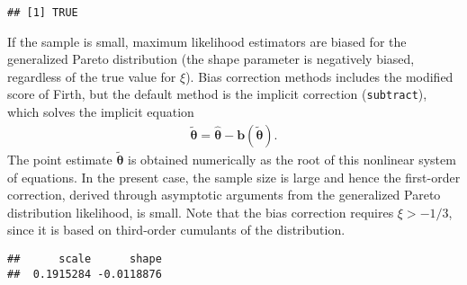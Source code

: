 \documentclass[]{book}
\newenvironment{Shaded}{\begin{snugshade}}{\end{snugshade}}
\newcommand{\CommentTok}[1]{\textcolor[rgb]{0.56,0.35,0.01}{\textit{#1}}}
\newcommand{\DataTypeTok}[1]{\textcolor[rgb]{0.13,0.29,0.53}{#1}}
\newcommand{\DecValTok}[1]{\textcolor[rgb]{0.00,0.00,0.81}{#1}}
\newcommand{\FloatTok}[1]{\textcolor[rgb]{0.00,0.00,0.81}{#1}}
\newcommand{\KeywordTok}[1]{\textcolor[rgb]{0.13,0.29,0.53}{\textbf{#1}}}
\newcommand{\NormalTok}[1]{#1}
\newcommand{\OperatorTok}[1]{\textcolor[rgb]{0.81,0.36,0.00}{\textbf{#1}}}
\newcommand{\StringTok}[1]{\textcolor[rgb]{0.31,0.60,0.02}{#1}}
\begin{document}
\begin{Shaded}
\end{Shaded}

\begin{verbatim}
## [1] TRUE
\end{verbatim}

If the sample is small, maximum likelihood estimators are biased for the generalized Pareto distribution (the shape parameter is negatively biased, regardless of the true value for \(\xi\)). Bias correction methods includes the modified score of Firth, but the default method is the implicit correction (\texttt{subtract}), which solves the
implicit equation
\begin{align}
   \boldsymbol{\tilde{\theta}}=\hat{\boldsymbol{\theta}}-\boldsymbol{b}(\tilde{\boldsymbol{\theta}}). \label{eq:implbias}
\end{align}
The point estimate \(\boldsymbol{\tilde{\theta}}\) is obtained numerically as the root of this nonlinear system of
equations. In the present case, the sample size is large and hence the first-order correction, derived through asymptotic arguments from the generalized Pareto distribution likelihood, is small. Note that the bias correction requires \(\xi > -1/3\), since it is based on third-order cumulants of the distribution.

\begin{Shaded}
\end{Shaded}

\begin{verbatim}
##      scale      shape 
##  0.1915284 -0.0118876
\end{verbatim}
\end{document}
